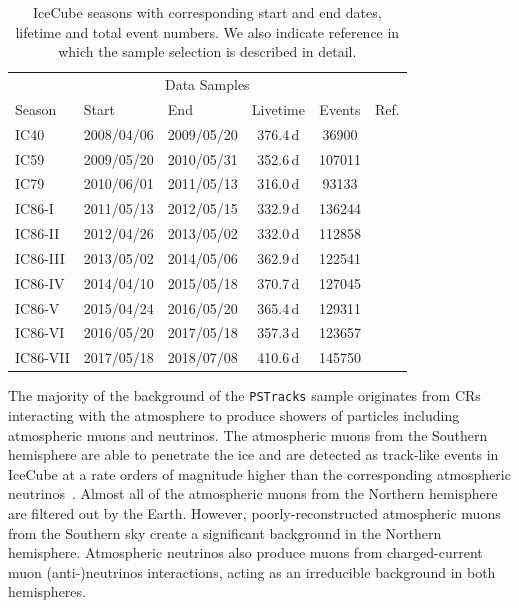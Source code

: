 \documentclass[aps,10pt,prd,twocolumn,floats,letterpaper,showpacs,nofootinbib,bibnotes,notitlepage,superscriptaddress,floatfix]{revtex4-1}
\begin{document}
\begin{table}[t]
\centering
\begin{ruledtabular}
\begin{tabular}{lllccc}
\multicolumn{6}{c}{Data Samples} \\[0.1cm]
Season & Start & End & Livetime & Events & Ref.\\ 
IC40 & 2008/04/06 & 2009/05/20 & 376.4\,d&  36900 & \cite{Abbasi:2010rd} \\
IC59 & 2009/05/20 & 2010/05/31 & 352.6\,d& 107011 &  \cite{Aartsen:2013uuv}\\
IC79 & 2010/06/01 & 2011/05/13 & 316.0\,d&  93133 & \cite{Schatto:2014kbj}\\
IC86-I & 2011/05/13 & 2012/05/15 & 332.9\,d & 136244 & \cite{Aartsen:2014cva} \\
IC86-II & 2012/04/26\footnotemark & 2013/05/02 & 332.0\,d & 112858 & \cite{Aartsen:2019fau} \\
IC86-III & 2013/05/02 & 2014/05/06 & 362.9\,d & 122541 &  \cite{Aartsen:2019fau}\\
IC86-IV & 2014/04/10\footnotemark & 2015/05/18 & 370.7\,d& 127045 & \cite{Aartsen:2019fau}\\
IC86-V & 2015/04/24\footnotemark & 2016/05/20 & 365.4\,d & 129311 & \cite{Aartsen:2019fau}\\
IC86-VI & 2016/05/20 & 2017/05/18 & 357.3\,d& 123657 & \cite{Aartsen:2019fau}\\
IC86-VII & 2017/05/18 & 2018/07/08 & 410.6\,d& 145750 & \cite{Aartsen:2019fau}\\
\end{tabular}
\end{ruledtabular}
\caption[]{IceCube seasons with corresponding start and end dates, lifetime and total event numbers. We also indicate reference in which the sample selection is described in detail.}\label{tab:livetimes}
\end{table}

The majority of the background of the {\tt PSTracks} sample originates from CRs interacting with the atmosphere to produce showers of particles including atmospheric muons and neutrinos. The atmospheric muons from the Southern hemisphere are able to penetrate the ice and are detected as track-like events in IceCube at a rate orders of magnitude higher than the corresponding atmospheric neutrinos~\cite{Aartsen:2016nxy}. Almost all of the atmospheric muons from the Northern hemisphere are filtered out by the Earth. However, poorly-reconstructed atmospheric muons from the Southern sky create a significant background in the Northern hemisphere.
Atmospheric neutrinos also produce muons from charged-current muon (anti-)neutrinos interactions, acting as an irreducible background in both hemispheres. 
\end{document}
